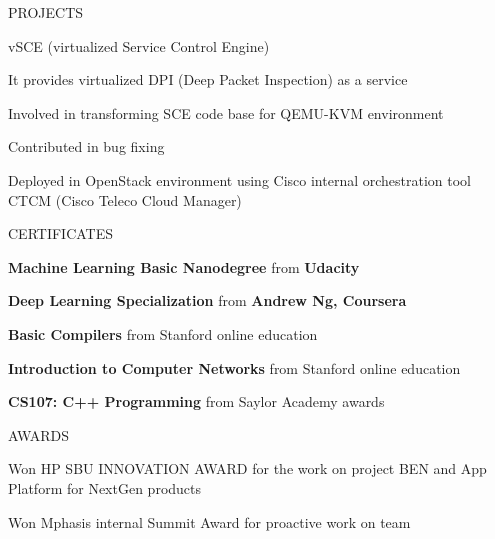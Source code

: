 \documentclass{resume} %
\begin{document}
\begin{rSection}{PROJECTS}
\begin{rSubsection}{vSCE (virtualized Service Control Engine)}
\vspace{-3pt}

\item It provides virtualized DPI (Deep Packet Inspection) as a service
\item Involved in transforming SCE code base for QEMU-KVM environment
\item Contributed in bug fixing
\item Deployed in OpenStack environment using Cisco internal orchestration tool CTCM (Cisco Teleco Cloud Manager)

\end{rSubsection}




\end{rSection} 

\vspace{-10pt}
\begin{rSection}{CERTIFICATES} \itemsep -1pt  

\begin{rSubsection}{}{ }{}    

\vspace{-8pt}

\item \textbf{Machine Learning Basic Nanodegree} from \textbf{Udacity}
\item \textbf{Deep Learning Specialization} from \textbf{Andrew Ng, Coursera}
\item \textbf{Basic Compilers} from Stanford online education
\item \textbf{Introduction to Computer Networks} from Stanford online education
\item \textbf{CS107: C++ Programming} from Saylor Academy awards
\end{rSubsection} 


\end{rSection}  


  
\begin{rSection}{AWARDS}

\begin{rSubsection}{}{}{}{}              
\item Won HP SBU INNOVATION AWARD for the work on project BEN and App Platform for NextGen products
\item Won Mphasis internal Summit Award for proactive work on team
\end{rSubsection}  

\end{rSection}
  
\end{document}
